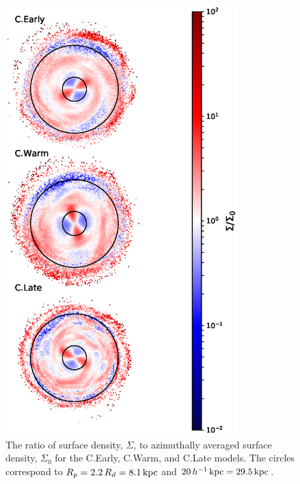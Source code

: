 \begin{figure}
    \centering
	\includegraphics[width=0.8\textwidth]{../figures/surface_density_ratios.eps} \caption{The ratio of surface density, $\Sigma$, to azimuthally averaged surface density, $\Sigma_0$ for the C.Early, C.Warm, and C.Late models. The circles correspond to $R_p = 2.2\, R_d = 8.1 \,\text{kpc}$ and $20 \,h^{-1} \, \text{kpc} = 29.5 \, \text{kpc}$.}
	\label{fig:final_densities}
\end{figure}

